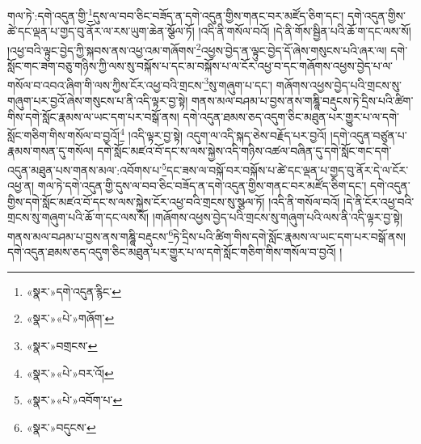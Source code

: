 གལ་ཏེ་:དགེ་འདུན་གྱི་\footnote{«སྣར་»དགེ་འདུན་རྙིང་}དུས་ལ་བབ་ཅིང་བཟོད་ན་དགེ་འདུན་གྱིས་གནང་བར་མཛོད་ཅིག་དང་། དགེ་འདུན་གྱིས་ཚེ་དང་ལྡན་པ་གྱད་བུ་ནོར་ལ་རས་ཡུག་ཆེན་སྩོལ་ཏོ། །འདི་ནི་གསོལ་བའོ། །དེ་ནི་གོས་སྦྱིན་པའི་ཆོ་ག་དང་ལས་སོ། །འཕྱ་བའི་ལྟུང་བྱེད་ཀྱི་སྐབས་ནས་འཕྱ་འམ་གཞོགས་\footnote{«སྣར་»«པེ་»གཞོག་}འཕྱས་བྱེད་ན་ལྟུང་བྱེད་དོ་ཞེས་གསུངས་པའི་ཞར་ལ། དགེ་སློང་གང་ཟག་བཅུ་གཉིས་ཀྱི་ལས་སུ་བསྐོས་པ་དང་མ་བསྐོས་པ་ལ་ངོར་འཕྱ་བ་དང་གཞོགས་འཕྱས་བྱེད་པ་ལ་གསོལ་བ་འབའ་ཞིག་གི་ལས་ཀྱིས་ངོར་འཕྱ་བའི་གྲངས་\footnote{«སྣར་»བགྲངས་}སུ་གཞུག་པ་དང་། གཞོགས་འཕྱས་བྱེད་པའི་གྲངས་སུ་གཞུག་པར་བྱའོ་ཞེས་གསུངས་པ་ནི་འདི་ལྟར་བྱ་སྟེ། གནས་མལ་བཤམ་པ་བྱས་ནས་གཎྜཱི་བརྡུངས་ཏེ་དྲིས་པའི་ཚིག་གིས་དགེ་སློང་རྣམས་ལ་ཡང་དག་པར་བསྒོ་ནས། དགེ་འདུན་ཐམས་ཅད་འདུག་ཅིང་མཐུན་པར་གྱུར་པ་ལ་དགེ་སློང་གཅིག་གིས་གསོལ་བ་བྱའོ།\footnote{«སྣར་»«པེ་»བར་འོ།} །འདི་ལྟར་བྱ་སྟེ། འདུག་ལ་འདི་སྐད་ཅེས་བརྗོད་པར་བྱའོ། །དགེ་འདུན་བཙུན་པ་རྣམས་གསན་དུ་གསོལ། དགེ་སློང་མཛའ་བོ་དང་ས་ལས་སྐྱེས་འདི་གཉིས་འཚལ་བཞིན་དུ་དགེ་སློང་གང་དགེ་འདུན་མཐུན་པས་གནས་མལ་:འབོགས་པ་\footnote{«སྣར་»«པེ་»འབོག་པ་}དང་ཟས་ལ་བསྐོ་བར་བསྐོས་པ་ཚེ་དང་ལྡན་པ་གྱད་བུ་ནོར་དེ་ལ་ངོར་འཕྱ་ན། གལ་ཏེ་དགེ་འདུན་གྱི་དུས་ལ་བབ་ཅིང་བཟོད་ན་དགེ་འདུན་གྱིས་གནང་བར་མཛོད་ཅིག་དང་། དགེ་འདུན་གྱིས་དགེ་སློང་མཛའ་བོ་དང་ས་ལས་སྐྱེས་ངོར་འཕྱ་བའི་གྲངས་སུ་སྩལ་ཏོ། །འདི་ནི་གསོལ་བའོ། །དེ་ནི་ངོར་འཕྱ་བའི་གྲངས་སུ་གཞུག་པའི་ཆོ་ག་དང་ལས་སོ། །གཞོགས་འཕྱས་བྱེད་པའི་གྲངས་སུ་གཞུག་པའི་ལས་ནི་འདི་ལྟར་བྱ་སྟེ། གནས་མལ་བཤམ་པ་བྱས་ནས་གཎྜཱི་བརྡུངས་\footnote{«སྣར་»བདུངས་}ཏེ་དྲིས་པའི་ཚིག་གིས་དགེ་སློང་རྣམས་ལ་ཡང་དག་པར་བསྒོ་ནས། དགེ་འདུན་ཐམས་ཅད་འདུག་ཅིང་མཐུན་པར་གྱུར་པ་ལ་དགེ་སློང་གཅིག་གིས་གསོལ་བ་བྱའོ། །

